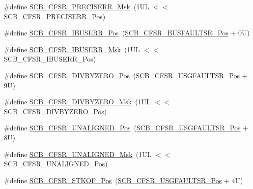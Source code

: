 \begin{DoxyCompactItemize}
\item 
\#define \mbox{\hyperlink{group___c_m_s_i_s___s_c_b_gad8fc0d1f80364470e52d3dcf941f38cc}{S\+C\+B\+\_\+\+C\+F\+S\+R\+\_\+\+P\+R\+E\+C\+I\+S\+E\+R\+R\+\_\+\+Msk}}~(1\+U\+L $<$$<$ S\+C\+B\+\_\+\+C\+F\+S\+R\+\_\+\+P\+R\+E\+C\+I\+S\+E\+R\+R\+\_\+\+Pos)
\item 
\#define \mbox{\hyperlink{group___c_m_s_i_s___s_c_b_gad01f4e7c1daa67e2ca8eb4411fd80df4}{S\+C\+B\+\_\+\+C\+F\+S\+R\+\_\+\+I\+B\+U\+S\+E\+R\+R\+\_\+\+Pos}}~(\mbox{\hyperlink{group___c_m_s_i_s___s_c_b_ga555a24f4f57d199f91d1d1ab7c8c3c8a}{S\+C\+B\+\_\+\+C\+F\+S\+R\+\_\+\+B\+U\+S\+F\+A\+U\+L\+T\+S\+R\+\_\+\+Pos}} + 0\+U)
\item 
\#define \mbox{\hyperlink{group___c_m_s_i_s___s_c_b_ga2a0907c95aabc4b9d77c3e28d14a717f}{S\+C\+B\+\_\+\+C\+F\+S\+R\+\_\+\+I\+B\+U\+S\+E\+R\+R\+\_\+\+Msk}}~(1\+U\+L $<$$<$ S\+C\+B\+\_\+\+C\+F\+S\+R\+\_\+\+I\+B\+U\+S\+E\+R\+R\+\_\+\+Pos)
\item 
\#define \mbox{\hyperlink{group___c_m_s_i_s___s_c_b_gaa8fc61d57be3e94db000367f521aa1fc}{S\+C\+B\+\_\+\+C\+F\+S\+R\+\_\+\+D\+I\+V\+B\+Y\+Z\+E\+R\+O\+\_\+\+Pos}}~(\mbox{\hyperlink{group___c_m_s_i_s___s_c_b_gac8e4197b295c8560e68e2d71285c7879}{S\+C\+B\+\_\+\+C\+F\+S\+R\+\_\+\+U\+S\+G\+F\+A\+U\+L\+T\+S\+R\+\_\+\+Pos}} + 9\+U)
\item 
\#define \mbox{\hyperlink{group___c_m_s_i_s___s_c_b_ga9d91a0850b4962ad1335b2eadac6777e}{S\+C\+B\+\_\+\+C\+F\+S\+R\+\_\+\+D\+I\+V\+B\+Y\+Z\+E\+R\+O\+\_\+\+Msk}}~(1\+U\+L $<$$<$ S\+C\+B\+\_\+\+C\+F\+S\+R\+\_\+\+D\+I\+V\+B\+Y\+Z\+E\+R\+O\+\_\+\+Pos)
\item 
\#define \mbox{\hyperlink{group___c_m_s_i_s___s_c_b_ga8836da99a7e569d7a5a79ab4eaa85690}{S\+C\+B\+\_\+\+C\+F\+S\+R\+\_\+\+U\+N\+A\+L\+I\+G\+N\+E\+D\+\_\+\+Pos}}~(\mbox{\hyperlink{group___c_m_s_i_s___s_c_b_gac8e4197b295c8560e68e2d71285c7879}{S\+C\+B\+\_\+\+C\+F\+S\+R\+\_\+\+U\+S\+G\+F\+A\+U\+L\+T\+S\+R\+\_\+\+Pos}} + 8\+U)
\item 
\#define \mbox{\hyperlink{group___c_m_s_i_s___s_c_b_gac7d2aa508a08a2cab97aa8683c87d125}{S\+C\+B\+\_\+\+C\+F\+S\+R\+\_\+\+U\+N\+A\+L\+I\+G\+N\+E\+D\+\_\+\+Msk}}~(1\+U\+L $<$$<$ S\+C\+B\+\_\+\+C\+F\+S\+R\+\_\+\+U\+N\+A\+L\+I\+G\+N\+E\+D\+\_\+\+Pos)
\item 
\#define \mbox{\hyperlink{group___c_m_s_i_s___s_c_b_ga35d4221dbc3b9ec07aa5eb66d3497d7f}{S\+C\+B\+\_\+\+C\+F\+S\+R\+\_\+\+S\+T\+K\+O\+F\+\_\+\+Pos}}~(\mbox{\hyperlink{group___c_m_s_i_s___s_c_b_gac8e4197b295c8560e68e2d71285c7879}{S\+C\+B\+\_\+\+C\+F\+S\+R\+\_\+\+U\+S\+G\+F\+A\+U\+L\+T\+S\+R\+\_\+\+Pos}} + 4\+U)

\end{DoxyCompactItemize}
